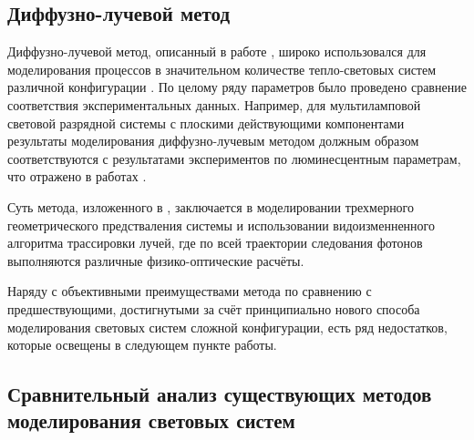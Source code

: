 \subsection{Диффузно-лучевой метод}

Диффузно-лучевой метод, описанный в работе \cite{gradov-dissertation}, широко использовался для моделирования процессов в значительном количестве тепло-световых систем различной конфигурации \cite{gradov-machine-modeling}.
По целому ряду параметров было проведено сравнение соответствия экспериментальных данных.
Например, для мультиламповой световой разрядной системы с плоскими действующими компонентами результаты моделирования диффузно-лучевым методом должным образом соответствуются с результатами экспериментов по люминесцентным параметрам, что отражено в работах \cite{gradov-calculation-methods, gradov-machine-modeling}.

Суть метода, изложенного в \cite{gradov-dissertation}, заключается в моделировании трехмерного геометрического предстваления системы и использовании видоизменненного алгоритма трассировки лучей, где по всей траектории следования фотонов выполняются различные физико-оптические расчёты.

Наряду с объективными преимуществами метода по сравнению с предшествующими, достигнутыми за счёт принципиально нового способа моделирования световых систем сложной конфигурации, есть ряд недостатков, которые освещены в следующем пункте работы.

\subsection{Сравнительный анализ существующих методов моделирования световых систем}

